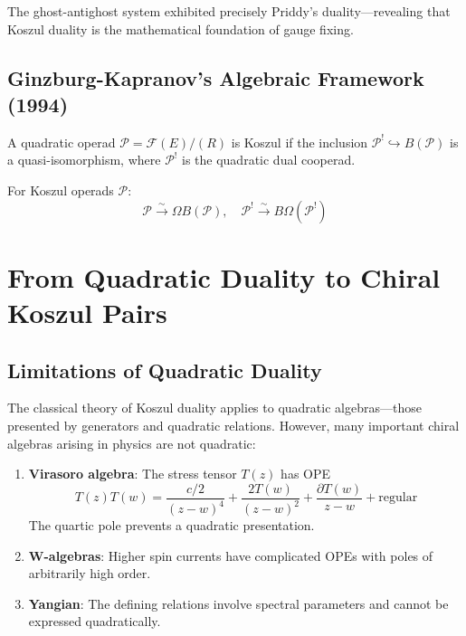 The ghost-antighost system exhibited precisely Priddy's duality—revealing that Koszul duality is the mathematical foundation of gauge fixing.

\subsection{Ginzburg-Kapranov's Algebraic Framework (1994)}

\begin{definition}
A quadratic operad $\mathcal{P} = \mathcal{F}(E)/(R)$ is Koszul if the inclusion $\mathcal{P}^! \hookrightarrow B(\mathcal{P})$ is a quasi-isomorphism, where $\mathcal{P}^!$ is the quadratic dual cooperad.
\end{definition}

\begin{theorem}
For Koszul operads $\mathcal{P}$:
$$\mathcal{P} \xrightarrow{\sim} \Omega B(\mathcal{P}), \quad \mathcal{P}^! \xrightarrow{\sim} B\Omega(\mathcal{P}^!)$$
\end{theorem}


\section{From Quadratic Duality to Chiral Koszul Pairs}

\subsection{Limitations of Quadratic Duality}

The classical theory of Koszul duality applies to quadratic algebras—those presented by generators and quadratic relations. However, many important chiral algebras arising in physics are not quadratic:

\begin{example}
\begin{enumerate}
\item \textbf{Virasoro algebra}: The stress tensor $T(z)$ has OPE
$$T(z)T(w) = \frac{c/2}{(z-w)^4} + \frac{2T(w)}{(z-w)^2} + \frac{\partial T(w)}{z-w} + \text{regular}$$
The quartic pole prevents a quadratic presentation.

\item \textbf{W-algebras}: Higher spin currents have complicated OPEs with poles of arbitrarily high order.

\item \textbf{Yangian}: The defining relations involve spectral parameters and cannot be expressed quadratically.
\end{enumerate}
\end{example}

